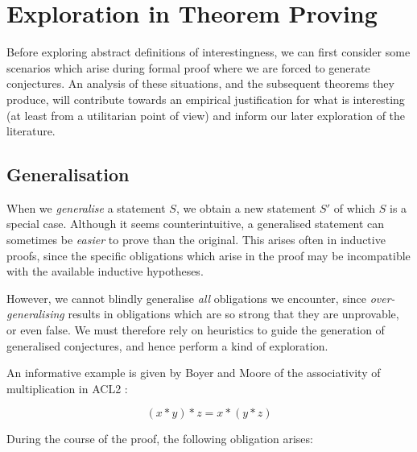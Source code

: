 

\section{Exploration in Theorem Proving}
\label{sec:examples}

Before exploring abstract definitions of interestingness, we can first consider
some scenarios which arise during formal proof where we are forced to generate
conjectures. An analysis of these situations, and the subsequent theorems they
produce, will contribute towards an empirical justification for what is
interesting (at least from a utilitarian point of view) and inform our later
exploration of the literature.

\subsection{Generalisation}

\providecommand{\coq}[1]{\lstinline[language=ML]|#1|}

When we \emph{generalise} a statement $S$, we obtain a new statement $S'$ of
which $S$ is a special case. Although it seems counterintuitive, a generalised
statement can sometimes be \emph{easier} to prove than the original. This arises
often in inductive proofs, since the specific obligations which arise in the
proof may be incompatible with the available inductive hypotheses.

However, we cannot blindly generalise \emph{all} obligations we encounter, since
\emph{over-generalising} results in obligations which are so strong that they
are unprovable, or even false. We must therefore rely on heuristics to guide the
generation of generalised conjectures, and hence perform a kind of exploration.

An informative example is given by Boyer and Moore of the associativity of
multiplication in ACL2 \cite{boyer1983proof}:

$$(x * y) * z = x * (y * z)$$

During the course of the proof, the following obligation arises:

